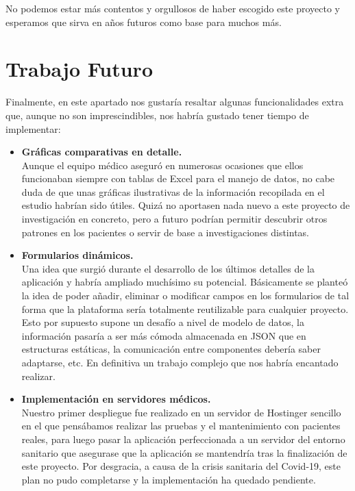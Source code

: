     No podemos estar más contentos y orgullosos de haber escogido este proyecto y esperamos que sirva en años futuros como base para muchos más. \newpage
    
     \section{Trabajo Futuro}
     
      Finalmente, en este apartado nos gustaría resaltar algunas funcionalidades extra que, aunque no son imprescindibles, nos habría gustado tener tiempo de implementar:
 \newline
 
 \begin{itemize}
  \item\textbf{Gráficas comparativas en detalle.} \\
  Aunque el equipo médico aseguró en numerosas ocasiones que ellos funcionaban siempre con tablas de Excel para el manejo de datos, no cabe duda de que unas gráficas ilustrativas de la información recopilada en el estudio habrían sido útiles. Quizá no aportasen nada nuevo a este proyecto de investigación en concreto, pero a futuro podrían permitir descubrir otros patrones en los pacientes o servir de base a investigaciones distintas. \\
  
  \item\textbf{Formularios dinámicos.} \\
  Una idea que surgió durante el desarrollo de los últimos detalles de la aplicación y habría ampliado muchísimo su potencial. Básicamente se planteó la idea de poder añadir, eliminar o modificar campos en los formularios de tal forma que la plataforma sería totalmente reutilizable para cualquier proyecto. Esto por supuesto supone un desafío a nivel de modelo de datos, la información pasaría a ser más cómoda almacenada en JSON que en estructuras estáticas, la comunicación entre componentes debería saber adaptarse, etc. En definitiva un trabajo complejo que nos habría encantado realizar. \\
  
  \item\textbf{Implementación en servidores médicos.} \\
  Nuestro primer despliegue fue realizado en un servidor de Hostinger sencillo en el que pensábamos realizar las pruebas y el mantenimiento con pacientes reales, para luego pasar la aplicación perfeccionada a un servidor del entorno sanitario que asegurase que la aplicación se mantendría tras la finalización de este proyecto. Por desgracia, a causa de la crisis sanitaria del Covid-19, este plan no pudo completarse y la implementación ha quedado pendiente.
  

\end{itemize}
